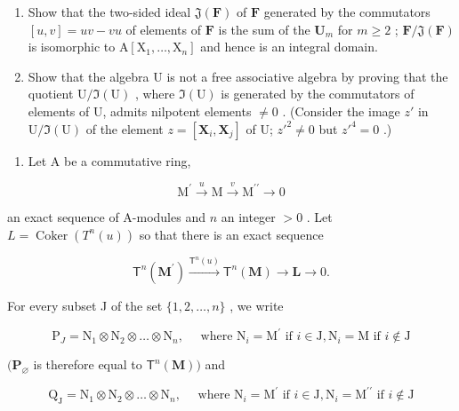 \begin{enumerate}
\def\labelenumi{(\alph{enumi})}
\setcounter{enumi}{3}
\item
  Show that the two-sided ideal \(\mathfrak{J}(\mathbf{F})\) of \(\mathbf{F}\) generated by the commutators \([u,v] = uv - vu\) of elements of \(\mathbf{F}\) is the sum of the \(\mathbf{U}_m\) for \(m\geqslant 2\) ; \(\mathbf{F} / \mathfrak{J}(\mathbf{F})\) is isomorphic to \(\mathrm{A}[\mathrm{X}_1,\dots ,\mathrm{X}_n]\) and hence is an integral domain.
\item
  Show that the algebra U is not a free associative algebra by proving that the quotient \(\mathrm{U}/\Im(\mathrm{U})\) , where \(\Im(\mathrm{U})\) is generated by the commutators of elements of U, admits nilpotent elements \(\neq0\) . (Consider the image \(z'\) in \(\mathrm{U}/\Im(\mathrm{U})\) of the element \(z = [\mathbf{X}_{i}, \mathbf{X}_{j}]\) of U; \(z'^{2} \neq 0\) but \(z'^{4} = 0\) .)
\end{enumerate}

\begin{enumerate}
\def\labelenumi{\arabic{enumi}.}
\setcounter{enumi}{9}
\tightlist
\item
  Let A be a commutative ring,
\end{enumerate}

\[
\mathrm{M} ^ {\prime} \xrightarrow {u} \mathrm{M} \xrightarrow {v} \mathrm{M} ^ {\prime \prime} \longrightarrow 0
\]

an exact sequence of A-modules and \(n\) an integer \(>0\) . Let \(L = \operatorname{Coker}(T^n(u))\) so that there is an exact sequence

\[
\mathsf {T} ^ {n} (\mathbf {M} ^ {\prime}) \xrightarrow {\mathsf {T} ^ {n} (u)} \mathsf {T} ^ {n} (\mathbf {M}) \to \mathbf {L} \to 0.
\]

For every subset J of the set \(\{1, 2, \ldots, n\}\) , we write

\[
\mathrm{P} _ {J} = \mathrm{N} _ {1} \otimes \mathrm{N} _ {2} \otimes \dots \otimes \mathrm{N} _ {n}, \quad \text { where } \mathrm{N} _ {i} = \mathrm{M} ^ {\prime} \text { if } i \in \mathrm{J}, \mathrm{N} _ {i} = \mathrm{M} \text { if } i \notin \mathrm{J}
\]

\((\mathbf{P}_{\varnothing}\) is therefore equal to \(\mathsf{T}^n (\mathbf{M}))\) and

\[
\mathrm{Q} _ {\mathrm{J}} = \mathrm{N} _ {1} \otimes \mathrm{N} _ {2} \otimes \dots \otimes \mathrm{N} _ {n}, \quad \text { where } \mathrm{N} _ {i} = \mathrm{M} ^ {\prime} \text { if } i \in \mathrm{J}, \mathrm{N} _ {i} = \mathrm{M} ^ {\prime \prime} \text { if } i \notin \mathrm{J}
\]

